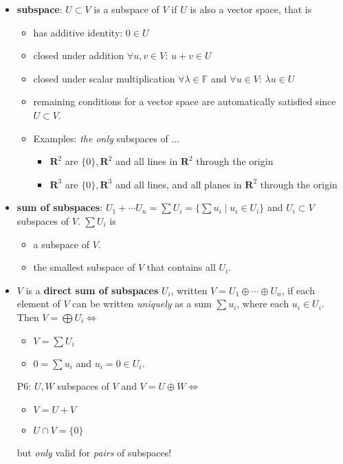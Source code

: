 \begin{itemize}
\item \textbf{subspace}: $U\subset V$ is a subspace of $V$ if $U$ is also a vector space, that is
\begin{itemize}
\item has additive identity: $0\in U$
\item closed under addition $\forall u,v \in V$: $u+v \in U$ 
\item closed under scalar multiplication $\forall \lambda\in \mathbb{F}$ and $\forall u \in V$: $\lambda u \in U$  
\item remaining conditions for a vector space are automatically satisfied since $U\subset V$.
\item Examples: \emph{the only} subspaces of ...
\begin{itemize}
  \item $\mathbf{R}^2$ are $\{0\}, \mathbf{R}^2$ and all lines in $\mathbf{R}^2$ through the origin
  \item $\mathbf{R}^3$ are $\{0\}, \mathbf{R}^3$ and all lines, and all planes in $\mathbf{R}^2$ through the origin
\end{itemize}

\end{itemize} 

\item \textbf{sum of subspaces}: $U_1+\cdots U_n = \sum U_i =\{\sum u_i\mid u_i\in U_i\}$ and $U_i\subset V$ subspaces of $V$. $\sum U_i$ is
\begin{itemize}
\item a subspace of $V$.
\item the smallest subspace of $V$ that contains all $U_i$.
\end{itemize}

\item $V$ is a \textbf{direct sum of subspaces} $U_i$, written $V=U_1\oplus\cdots\oplus U_n$, if each element of $V$ can be written \emph{uniquely} as a sum $\sum u_i$, where each $u_i\in U_i$. 
Then $V=\bigoplus U_i \iff$
\begin{itemize}
\item $V = \sum U_i$
\item $0=\sum u_i$ and $u_i=0 \in U_i$.
\end{itemize}

\item[P6:\label{it:P1_6}] $U,W$ subspaces of $V$ and $V=U\oplus W \iff$
\begin{itemize}
\item $V=U+V$
\item $U\cap V=\{0\}$
\end{itemize}
but \emph{only} valid for \emph{pairs} of subspaces!

\end{itemize}

